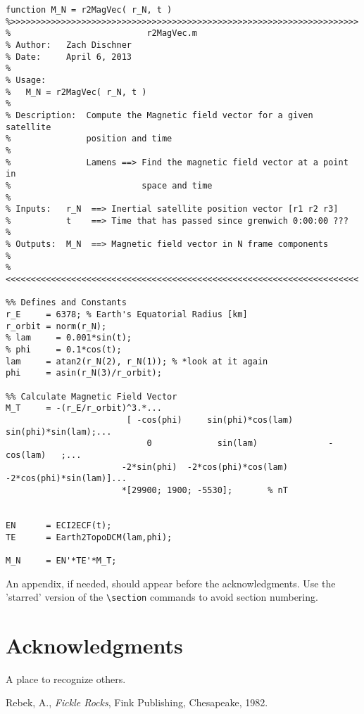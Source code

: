 \documentclass[]{aiaa-tc}%
\begin{document}
\label{APP:Code for Part E}
\begin{lstlisting}
function M_N = r2MagVec( r_N, t )
%>>>>>>>>>>>>>>>>>>>>>>>>>>>>>>>>>>>>>>>>>>>>>>>>>>>>>>>>>>>>>>>>>>>>> 
%                           r2MagVec.m
% Author:   Zach Dischner
% Date:     April 6, 2013
% 
% Usage:
%   M_N = r2MagVec( r_N, t )
%
% Description:  Compute the Magnetic field vector for a given satellite
%               position and time
% 
%               Lamens ==> Find the magnetic field vector at a point in
%                          space and time
% 
% Inputs:   r_N  ==> Inertial satellite position vector [r1 r2 r3]
%           t    ==> Time that has passed since grenwich 0:00:00 ???
%
% Outputs:  M_N  ==> Magnetic field vector in N frame components
% 
%<<<<<<<<<<<<<<<<<<<<<<<<<<<<<<<<<<<<<<<<<<<<<<<<<<<<<<<<<<<<<<<<<<<<<<

%% Defines and Constants
r_E     = 6378; % Earth's Equatorial Radius [km]
r_orbit = norm(r_N);
% lam     = 0.001*sin(t);
% phi     = 0.1*cos(t);
lam     = atan2(r_N(2), r_N(1)); % *look at it again
phi     = asin(r_N(3)/r_orbit);

%% Calculate Magnetic Field Vector
M_T     = -(r_E/r_orbit)^3.*...
                        [ -cos(phi)     sin(phi)*cos(lam)     sin(phi)*sin(lam);...
                            0             sin(lam)              -cos(lam)   ;...
                       -2*sin(phi)  -2*cos(phi)*cos(lam)   -2*cos(phi)*sin(lam)]...
                       *[29900; 1900; -5530];       % nT
                   
                   
EN      = ECI2ECF(t);
TE      = Earth2TopoDCM(lam,phi);

M_N     = EN'*TE'*M_T;
\end{lstlisting}



An appendix, if needed, should appear before the acknowledgments.
Use the 'starred' version of the \verb|\section| commands to avoid
section numbering.

\section*{Acknowledgments}

A place to recognize others.

\begin{thebibliography}{9}%
 Rebek, A., {\it Fickle Rocks}, Fink Publishing, Chesapeake, 1982.
\end{thebibliography}
\end{document}
